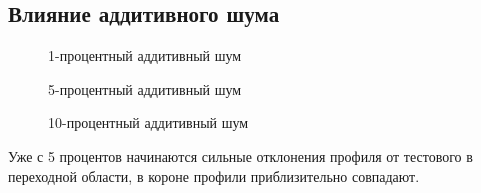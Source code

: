 \documentclass[a4paper]{article}
\begin{document}
\subsection*{Влияние аддитивного шума}
\begin{figure}[h!]
\caption{1-процентный аддитивный шум}
\end{figure}
\begin{figure}[h!]
\caption{5-процентный аддитивный шум}
\end{figure}
\begin{figure}[h!]
\caption{10-процентный аддитивный шум}
\end{figure}
\hfill\break
\hfill\break
\hfill\break
\hfill\break
\hfill\break
\hfill\break
\hfill\break
Уже с 5 процентов начинаются сильные отклонения профиля от тестового в переходной области, в короне профили приблизительно совпадают.
\newpage
\end{document}
